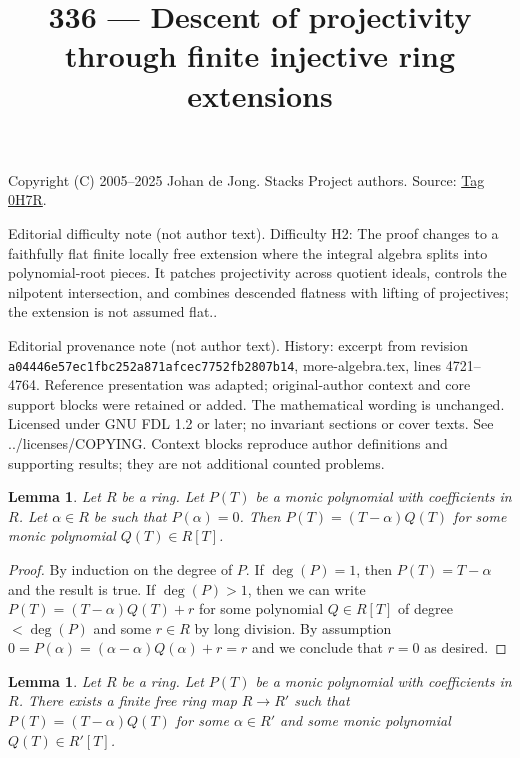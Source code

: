 \documentclass{amsart}
\theoremstyle{plain}
\newtheorem{lemma}[subsection]{Lemma}
\theoremstyle{definition}
\theoremstyle{remark}
\numberwithin{equation}{subsection}
\begin{document}
\title[Stacks Project, Tag 0H7R]{336 --- Descent of projectivity through finite injective ring extensions}
\maketitle
\noindent Copyright (C) 2005--2025 Johan de Jong. Stacks Project authors. Source: \href{https://stacks.math.columbia.edu/tag/0H7R}{Tag 0H7R}.

\noindent Editorial difficulty note (not author text). Difficulty H2: The proof changes to a faithfully flat finite locally free extension where the integral algebra splits into polynomial-root pieces. It patches projectivity across quotient ideals, controls the nilpotent intersection, and combines descended flatness with lifting of projectives; the extension is not assumed flat..

\noindent Editorial provenance note (not author text). History: excerpt from revision \texttt{a0444\allowbreak 6e57e\allowbreak c1fbc\allowbreak 252a8\allowbreak 71afc\allowbreak ec775\allowbreak 2fb28\allowbreak 07b14}, more-algebra.tex, lines 4721--4764. Reference presentation was adapted; original-author context and core support blocks were retained or added. The mathematical wording is unchanged. Licensed under GNU FDL 1.2 or later; no invariant sections or cover texts. See ../licenses/COPYING. Context blocks reproduce author definitions and supporting results; they are not additional counted problems.

\begin{lemma}
\label{lemma-have-one-root}
Let $R$ be a ring. Let $P(T)$ be a monic polynomial with coefficients
in $R$. Let $\alpha \in R$ be such that $P(\alpha) = 0$. Then
$P(T) = (T - \alpha)Q(T)$ for some monic polynomial $Q(T) \in R[T]$.
\end{lemma}

\begin{proof}
By induction on the degree of $P$. If $\deg(P) = 1$, then
$P(T) = T - \alpha$ and the result is true. If $\deg(P) > 1$, then
we can write $P(T) = (T - \alpha)Q(T) + r$ for some polynomial
$Q \in R[T]$ of degree $< \deg(P)$ and some $r \in R$ by long
division. By assumption $0 = P(\alpha) = (\alpha - \alpha)Q(\alpha) + r = r$
and we conclude that $r = 0$ as desired.
\end{proof}


\begin{lemma}
\label{lemma-adjoin-one-root}
Let $R$ be a ring. Let $P(T)$ be a monic polynomial with coefficients
in $R$. There exists a finite free ring map $R \to R'$ such that
$P(T) = (T - \alpha)Q(T)$ for some $\alpha \in R'$ and some
monic polynomial $Q(T) \in R'[T]$.
\end{lemma}
\end{document}

